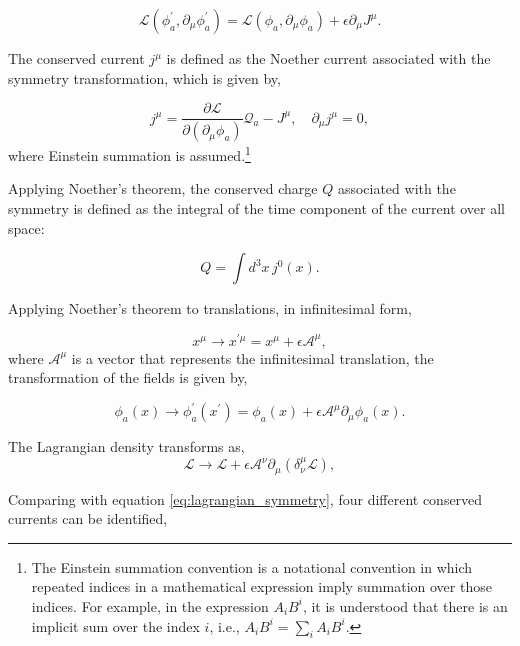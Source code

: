 \documentclass[11pt,a4paper,twoside,pdf]{article}
\numberwithin{equation}{section}
\begin{document}
\begin{equation}
    \mathcal{L}(\phi_a^\prime, \partial_\mu \phi_a^\prime) = 
    \mathcal{L}(\phi_a, \partial_\mu \phi_a) + \epsilon \partial_\mu J^\mu.
    \label{eq:lagrangian_symmetry}
\end{equation}

The conserved current \(j^\mu\) is defined as the Noether current associated with the
symmetry transformation, which is given by,

\begin{equation}
    j^\mu = \frac{\partial \mathcal{L}}{\partial (\partial_\mu \phi_a)} \mathcal{Q}_a 
    - J^\mu, \quad \partial_\mu j^\mu = 0,
\end{equation}
where Einstein summation is assumed.\footnote{
    The Einstein summation convention is a notational convention in which repeated 
    indices in a mathematical expression imply summation over those indices. For example, 
    in the expression \(A_i B^i\), it is understood that there is an implicit sum over 
    the index \(i\), i.e., \(A_i B^i = \sum_i A_i B^i\). 
}

Applying Noether's theorem, the conserved charge \(Q\) associated with the symmetry is 
defined as the integral of the time component of the current over all space:

\begin{equation}
    Q = \int d^3x \, j^0(x).
\end{equation}

Applying Noether's theorem to translations, in infinitesimal form, 

\begin{equation}
    x^\mu \to x^{\prime\mu} = x^\mu + \epsilon \mathcal{A}^\mu,
\end{equation}
where \(\mathcal{A}^\mu\) is a vector that represents the infinitesimal translation, 
the transformation of the fields is given by,

\begin{equation}
    \phi_a(x) \to \phi_a^\prime(x^\prime) = \phi_a(x) + \epsilon \mathcal{A}^\mu 
    \partial_\mu \phi_a(x).
\end{equation}

The Lagrangian density transforms as,
\begin{equation}
    \mathcal{L} \to \mathcal{L} + \epsilon \mathcal{A}^\nu \partial_\mu 
    \left(\delta_\nu^\mu \mathcal{L}\right),
\end{equation}

Comparing with equation \eqref{eq:lagrangian_symmetry}, four different conserved
currents can be identified,
\end{document}
